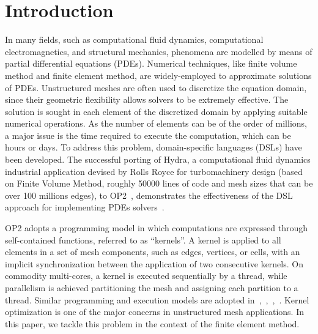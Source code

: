 \documentclass[conference]{IEEEtran}
\begin{document}
\section{Introduction}
In many fields, such as computational fluid dynamics, computational electromagnetics, and structural mechanics, phenomena are modelled by means of partial differential equations (PDEs). Numerical techniques, like finite volume method and finite element method, are widely-employed to approximate solutions of PDEs. Unstructured meshes are often used to discretize the equation domain, since their geometric flexibility allows solvers to be extremely effective. The solution is sought in each element of the discretized domain by applying suitable numerical operations. As the number of elements can be of the order of millions, a major issue is the time required to execute the computation, which can be hours or days. To address this problem, domain-specific languages (DSLs) have been developed. The successful porting of Hydra, a computational fluid dynamics industrial application devised by Rolls Royce for turbomachinery design (based on Finite Volume Method, roughly 50000 lines of code and mesh sizes that can be over 100 millions edges), to OP2~\cite{op2-main}, demonstrates the effectiveness of the DSL approach for implementing PDEs solvers~\cite{IstvanHydra}.

OP2 adopts a programming model in which computations are expressed through self-contained functions, referred to as ``kernels''. A kernel is applied to all elements in a set of mesh components, such as edges, vertices, or cells, with an implicit synchronization between the application of two consecutive kernels. On commodity multi-cores, a kernel is executed sequentially by a thread, while parallelism is achieved partitioning the mesh and assigning each partition to a thread. Similar programming and execution models are adopted in~\cite{pyop2isc},~\cite{Fenics},~\cite{fluidity_manual_v4},~\cite{lizst}. Kernel optimization is one of the major concerns in unstructured mesh applications. In this paper, we tackle this problem in the context of the finite element method.
\end{document}

